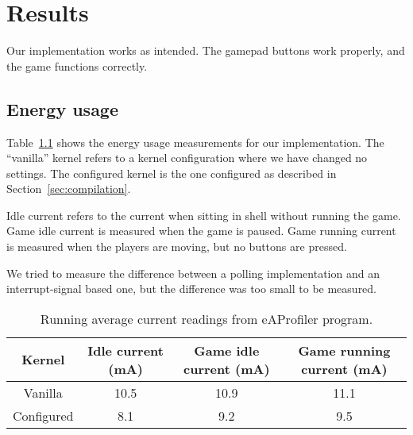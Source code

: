 \chapter{Results}


Our implementation works as intended. The gamepad buttons work properly, and the game functions correctly.

\section{Energy usage}
Table~\ref{tab:current} shows the energy usage measurements for our implementation. The ``vanilla'' kernel refers to a kernel configuration where we have changed no settings. The configured kernel is the one configured as described in Section~\ref{sec:compilation}.

Idle current refers to the current when sitting in shell without running the game. Game idle current is measured when the game is paused. Game running current is measured when the players are moving, but no buttons are pressed.

We tried to measure the difference between a polling implementation and an interrupt-signal based one, but the difference was too small to be measured.

\begin{table}[b]
\centering
\begin{tabular}{cccc}
Kernel & Idle current (mA) & Game idle current (mA) & Game running current (mA) \\\hline
Vanilla & 10.5 & 10.9 & 11.1 \\
Configured & 8.1 & 9.2 & 9.5 \\ 
\end{tabular}
\caption{Running average current readings from eAProfiler program.}
\label{tab:current}
\end{table}

